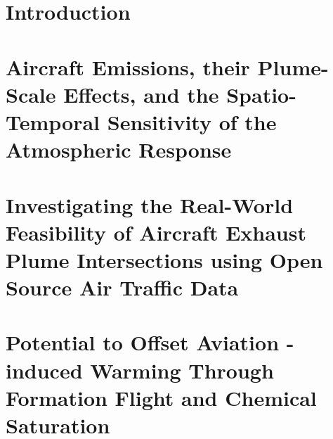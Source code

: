 \chapter{Introduction}
\label{chapter1}


\chapter{Aircraft Emissions, their Plume-Scale Effects, and the Spatio-Temporal Sensitivity of the Atmospheric Response}
\label{chapter2}


\chapter{Investigating the Real-World Feasibility of Aircraft Exhaust Plume Intersections using Open Source Air Traffic Data} 
\label{chapter3}


\chapter{Potential to Offset Aviation \texorpdfstring{}{NOx}-induced Warming Through Formation Flight and Chemical Saturation}\label{chapter4}

